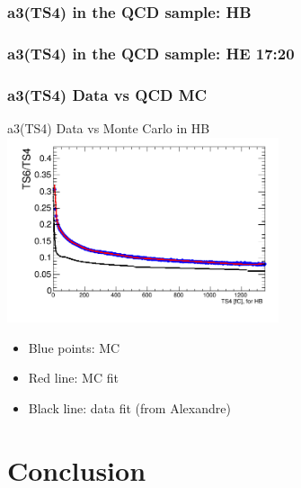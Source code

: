 \documentclass[bigger]{beamer}
\begin{document}
\begin{frame}
\frametitle{a3(TS4) in the QCD sample: HB}
\label{sec-3-7-2}
\label{sec-3-7-2-1}

\begin{center}
\resizebox*{!}{0.75\textheight}{

}
\end{center}
\end{frame}
\begin{frame}
\frametitle{a3(TS4) in the QCD sample: HE 17:20}
\label{sec-3-7-3}
\label{sec-3-7-3-1}

\begin{center}
\resizebox*{!}{0.75\textheight}{

}
\end{center}
\end{frame}
\begin{frame}
\frametitle{a3(TS4) Data vs QCD MC}
\label{sec-3-7-4}
\label{sec-3-7-4-1}

\centering
a3(TS4) Data vs Monte Carlo in HB
\includegraphics[width=0.6\textwidth]{fig/a2_ring0_daata.png}
\label{sec-3-7-4-2}
\begin{itemize}

\item Blue points: MC
\label{sec-3-7-4-2-1}%

\item Red line: MC fit
\label{sec-3-7-4-2-2}%

\item Black line: data fit (from Alexandre)
\label{sec-3-7-4-2-3}%
\end{itemize} %
\end{frame}
\section{Conclusion}
\label{sec-4}
\end{document}
